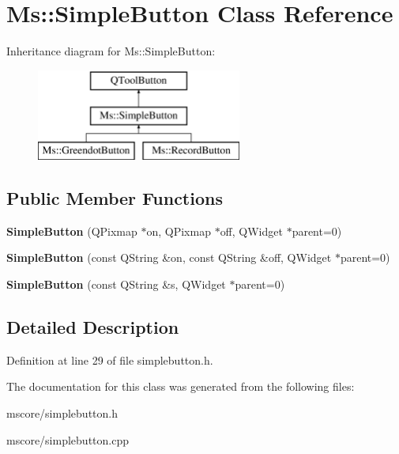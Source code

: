 \hypertarget{class_ms_1_1_simple_button}{}\section{Ms\+:\+:Simple\+Button Class Reference}
\label{class_ms_1_1_simple_button}
Inheritance diagram for Ms\+:\+:Simple\+Button\+:\begin{figure}[H]
\begin{center}
\leavevmode
\includegraphics[height=3.000000cm]{class_ms_1_1_simple_button}
\end{center}
\end{figure}
\subsection*{Public Member Functions}
\begin{DoxyCompactItemize}
\item 
\mbox{\label{class_ms_1_1_simple_button_aca2a39f5a9d054a3e761f5dad1629d86}} 
{\bfseries Simple\+Button} (Q\+Pixmap $\ast$on, Q\+Pixmap $\ast$off, Q\+Widget $\ast$parent=0)
\item 
\mbox{\label{class_ms_1_1_simple_button_a24f89695d680b3f2064ed5e1ab4d00e0}} 
{\bfseries Simple\+Button} (const Q\+String \&on, const Q\+String \&off, Q\+Widget $\ast$parent=0)
\item 
\mbox{\label{class_ms_1_1_simple_button_abd721ab9b7bf95f6d88b091ba92baf02}} 
{\bfseries Simple\+Button} (const Q\+String \&s, Q\+Widget $\ast$parent=0)
\end{DoxyCompactItemize}


\subsection{Detailed Description}


Definition at line 29 of file simplebutton.\+h.



The documentation for this class was generated from the following files\+:\begin{DoxyCompactItemize}
\item 
mscore/simplebutton.\+h\item 
mscore/simplebutton.\+cpp\end{DoxyCompactItemize}
